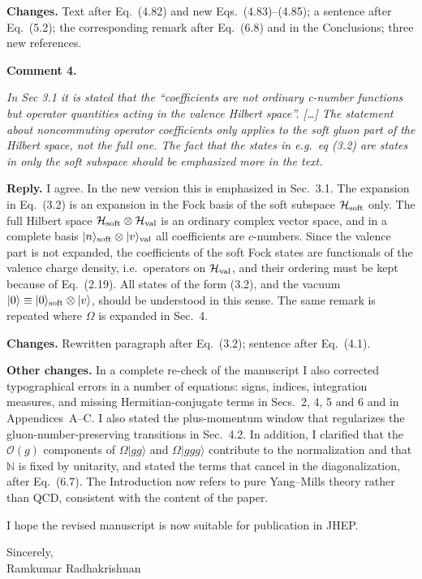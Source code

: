 \documentclass[11pt,a4paper]{article}
\newenvironment{comment}[1]{\par\medskip\noindent\textbf{Comment #1.}\par\vspace{2pt}%
  \begin{list}{}{\leftmargin=12pt\rightmargin=12pt}\item\itshape\small}{\end{list}\vspace{-2pt}}
\newcommand{\reply}{\noindent\textbf{Reply.} }
\newcommand{\changes}{\par\noindent\textbf{Changes.} }
\newcommand{\mf}[1]{\mathbb{#1}}
\begin{document}
\changes Text after Eq.~(4.82) and new Eqs.~(4.83)--(4.85); a sentence after Eq.~(5.2); the corresponding remark after Eq.~(6.8) and in the Conclusions; three new references.

\begin{comment}{4}
In Sec 3.1 it is stated that the ``coefficients are not ordinary c-number functions but operator quantities acting in the valence Hilbert space''. [\ldots] The statement about noncommuting operator coefficients only applies to the soft gluon part of the Hilbert space, not the full one. The fact that the states in e.g.\ eq (3.2) are states in only the soft subspace should be emphasized more in the text.
\end{comment}

\reply I agree. In the new version this is emphasized in Sec.~3.1. The expansion in Eq.~(3.2) is an expansion in the Fock basis of the soft subspace $\mathcal{H}_{\rm soft}$ only. The full Hilbert space $\mathcal{H}_{\rm soft}\otimes\mathcal{H}_{\rm val}$ is an ordinary complex vector space, and in a complete basis $|n\rangle_{\rm soft}\otimes|v\rangle_{\rm val}$ all coefficients are $c$-numbers. Since the valence part is not expanded, the coefficients of the soft Fock states are functionals of the valence charge density, i.e.\ operators on $\mathcal{H}_{\rm val}$, and their ordering must be kept because of Eq.~(2.19). All states of the form (3.2), and the vacuum $|0\rangle\equiv|0\rangle_{\rm soft}\otimes|v\rangle$, should be understood in this sense. The same remark is repeated where $\Omega$ is expanded in Sec.~4.

\changes Rewritten paragraph after Eq.~(3.2); sentence after Eq.~(4.1).

\medskip
\textbf{Other changes.} In a complete re-check of the manuscript I also corrected typographical errors in a number of equations: signs, indices, integration measures, and missing Hermitian-conjugate terms in Secs.~2, 4, 5 and 6 and in Appendices~A--C. I also stated the plus-momentum window that regularizes the gluon-number-preserving transitions in Sec.~4.2. In addition, I clarified that the $\mathcal{O}(g)$ components of $\Omega|gg\rangle$ and $\Omega|ggg\rangle$ contribute to the normalization and that $\mf{N}$ is fixed by unitarity, and stated the terms that cancel in the diagonalization, after Eq.~(6.7). The Introduction now refers to pure Yang--Mills theory rather than QCD, consistent with the content of the paper.

I hope the revised manuscript is now suitable for publication in JHEP.

\medskip
Sincerely,\\
Ramkumar Radhakrishnan
\end{document}
